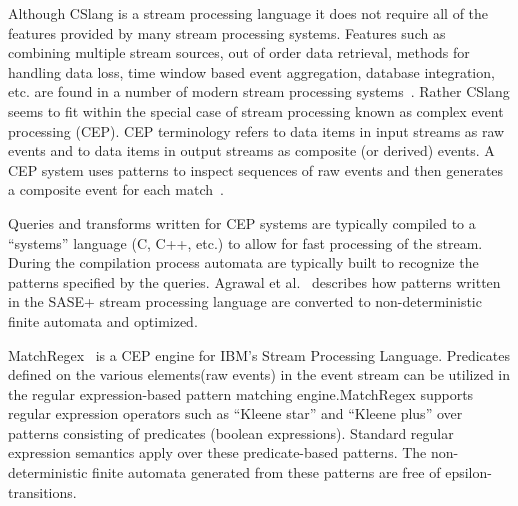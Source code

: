 Although CSlang is a stream processing language it does not
require all of the features provided by many stream processing systems. Features
such as combining multiple stream sources, out of order data retrieval, methods
for handling data loss, time window based event aggregation, database
integration, etc. are found in a number of modern stream processing
systems~\cite{DBLP:journals/csur/DayarathnaP18}.   Rather CSlang seems to fit within the special case of
stream processing known as complex event processing (CEP). CEP terminology refers
to data items in input streams as raw events and to data items in output streams
as composite (or derived) events. A CEP system uses patterns to inspect
sequences of raw events and then generates a composite event for each
match~\cite{DBLP:journals/ibmrd/HirzelAGJKKMNSSW13}.

Queries and transforms written for CEP systems are
typically compiled to a “systems” language (C, C++, etc.) to allow for fast
processing of the stream. During the compilation process automata are typically
built to recognize the patterns specified by the queries. Agrawal et
al.~\cite{DBLP:conf/sigmod/AgrawalDGI08} describes how patterns written in the SASE+ stream
processing language are converted to non-deterministic finite automata and
optimized.

MatchRegex~\cite{DBLP:conf/debs/Hirzel12} is a CEP engine for IBM’s Stream Processing
Language. Predicates defined on the various elements(raw events) in the event
stream can be utilized in the regular expression-based pattern matching
engine.MatchRegex supports regular expression operators such as “Kleene star”
and “Kleene plus” over patterns consisting of predicates (boolean expressions).
Standard regular expression semantics apply over these predicate-based patterns.
The non-deterministic finite automata generated from these patterns are free of
epsilon-transitions.
